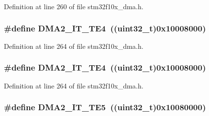 Definition at line 260 of file stm32f10x\+\_\+dma.\+h.

\subsubsection[{\texorpdfstring{D\+M\+A2\+\_\+\+I\+T\+\_\+\+T\+E4}{DMA2_IT_TE4}}]{\setlength{\rightskip}{0pt plus 5cm}\#define D\+M\+A2\+\_\+\+I\+T\+\_\+\+T\+E4~(({\bf uint32\+\_\+t})0x10008000)}\hypertarget{group___d_m_a__interrupts__definition_ga54dfd8a41ad683f01e3103e6473a7aff}{}\label{group___d_m_a__interrupts__definition_ga54dfd8a41ad683f01e3103e6473a7aff}


Definition at line 264 of file stm32f10x\+\_\+dma.\+h.

\subsubsection[{\texorpdfstring{D\+M\+A2\+\_\+\+I\+T\+\_\+\+T\+E4}{DMA2_IT_TE4}}]{\setlength{\rightskip}{0pt plus 5cm}\#define D\+M\+A2\+\_\+\+I\+T\+\_\+\+T\+E4~(({\bf uint32\+\_\+t})0x10008000)}\hypertarget{group___d_m_a__interrupts__definition_ga54dfd8a41ad683f01e3103e6473a7aff}{}\label{group___d_m_a__interrupts__definition_ga54dfd8a41ad683f01e3103e6473a7aff}


Definition at line 264 of file stm32f10x\+\_\+dma.\+h.

\subsubsection[{\texorpdfstring{D\+M\+A2\+\_\+\+I\+T\+\_\+\+T\+E5}{DMA2_IT_TE5}}]{\setlength{\rightskip}{0pt plus 5cm}\#define D\+M\+A2\+\_\+\+I\+T\+\_\+\+T\+E5~(({\bf uint32\+\_\+t})0x10080000)}\hypertarget{group___d_m_a__interrupts__definition_gad47115e9a4d0d3f5d9101097983b5525}{}\label{group___d_m_a__interrupts__definition_gad47115e9a4d0d3f5d9101097983b5525}


